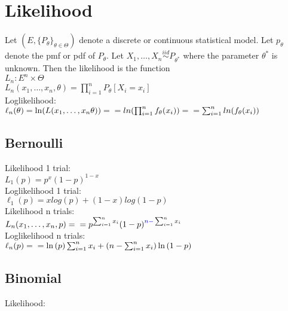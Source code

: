 \section{Likelihood}

Let $(E, \{ P_\theta \} _{\theta \in \Theta })$ denote a discrete or continuous statistical model. Let $p_\theta$ denote the pmf or pdf of $P_\theta$. Let $X_1, \ldots , X_ n \stackrel{iid}{\sim } P_{\theta ^*}$ where the parameter $\theta ^*$  is unknown. Then the likelihood is the function \\

$\displaystyle  L_ n: E^ n \times \Theta$\\
$L_ n(x_1, \ldots , x_ n, \theta) = \prod _{i = 1}^ n P_{\theta}[X_i=x_i] $\\

Loglikelihood:\\
$\ell_n (\theta ) = \ln (L(x_1,\ldots, x_n \theta ))=\\
= ln (\prod _{i = 1}^ n f_\theta (x_i))=\\ 
= \sum _{i = 1}^ n ln(f_\theta(x_i))$\\

\subsection*{Bernoulli}

Likelihood 1 trial:\\
$L_ 1(p) = p^x (1-p)^{1-x}$\\

Loglikelihood 1 trial:\\
$\ell_1(p) = x log(p) + (1-x) log (1-p)$\\


Likelihood n trials:\\

$L_ n(x_1, \ldots , x_ n, p) =\\
= p^{\sum _{i = 1}^ n x_ i} (1 -p)^{{\color{blue}{n - }} \sum _{i = 1}^ n x_ i}$ \\

Loglikelihood n trials:\\

$\ell_n (p) = \\ = \ln  \left( p \right) \sum _{i=1}^{n}x_{{i}}+ \left( n-\sum _{i=1}^{n}
x_{{i}} \right) \ln  \left( 1-p \right) 
$\\

\subsection*{Binomial}
Likelihood:\\


